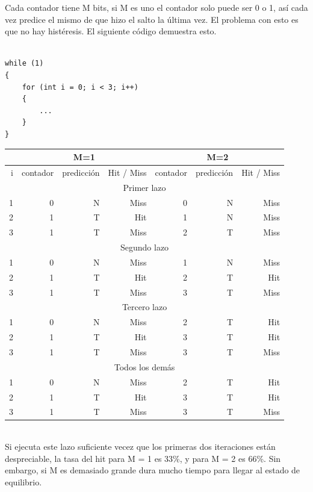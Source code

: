 \documentclass[a4paper]{article}
\begin{document}
Cada contador tiene M bits, si M es uno el contador solo puede ser 0 o 1, así cada vez predice el mismo de que hizo el salto la última vez. El problema con esto es que no hay histéresis. El siguiente código demuestra esto.

\begin{verbatim}

while (1)
{
    for (int i = 0; i < 3; i++)
    {
        ...
    }
}

\end{verbatim}

\begin{tabular}{| r | r r r | r r r |}
\cline{2-7}
\multicolumn{1}{c|}{} & \multicolumn{3}{c|}{M=1} & \multicolumn{3}{c|}{M=2} \\ \hline
i & contador & predicción & Hit / Miss & contador & predicción & Hit / Miss \\ \hline
\multicolumn{7}{|c|}{Primer lazo} \\ \hline
1 &     0 & N & Miss &      0 & N & Miss \\
2 &     1 & T & Hit &       1 & N & Miss \\
3 &     1 & T & Miss &      2 & T & Miss \\

\hline
\multicolumn{7}{|c|}{Segundo lazo} \\ \hline
1 &     0 & N & Miss &      1 & N & Miss \\
2 &     1 & T & Hit &       2 & T & Hit  \\
3 &     1 & T & Miss &      3 & T & Miss \\

\hline
\multicolumn{7}{|c|}{Tercero lazo} \\ \hline
1 &     0 & N & Miss &      2 & T & Hit \\
2 &     1 & T & Hit &       3 & T & Hit  \\
3 &     1 & T & Miss &      3 & T & Miss \\

\hline
\multicolumn{7}{|c|}{Todos los demás} \\ \hline
1 &     0 & N & Miss &      2 & T & Hit \\
2 &     1 & T & Hit &       3 & T & Hit  \\
3 &     1 & T & Miss &      3 & T & Miss \\

\hline
\end{tabular} \\

Si ejecuta este lazo suficiente vecez que los primeras dos iteraciones están despreciable, la tasa del hit para M = 1 es 33\%, y para M = 2 es 66\%. Sin embargo, si M es demasiado grande dura mucho tiempo para llegar al estado de equilibrio.
\end{document}
